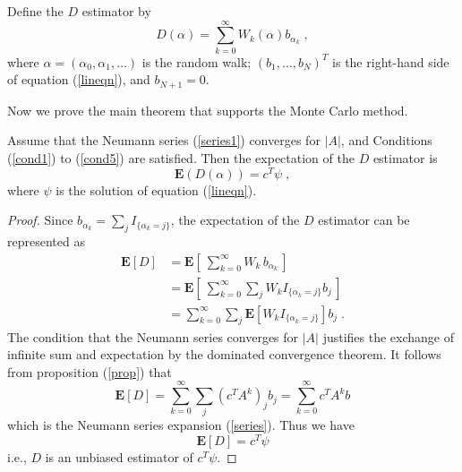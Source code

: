         \begin{definition}
            Define the $D$ estimator by
            \begin{equation} \label{D}
                D(\alpha) = \sum_{k=0}^\infty W_k(\alpha) b_{\alpha_k} \;,
            \end{equation}
            where $\alpha = (\alpha_0,\alpha_1,\ldots)$ is the random walk;
            $(b_1,\ldots,b_N)^T$ is the right-hand side of equation
            (\ref{lineqn}), and $b_{N+1} = 0$.
        \end{definition}
        Now we prove the main theorem that supports the Monte Carlo method.
        \begin{theorem} \label{mainthm}
            Assume that the Neumann series (\ref{series1}) converges for $|A|$,
            and Conditions (\ref{cond1}) to (\ref{cond5}) are satisfied.
            Then the expectation of the $D$ estimator is
            \[ \mathbf{E}( D(\alpha) ) = c^T \psi\;, \]
            where $\psi$ is the solution of equation (\ref{lineqn}).
        \end{theorem}
        \begin{proof}
            Since $b_{\alpha_k} = \sum_j I_{\{\alpha_k=j\}}$, the expectation
            of the $D$ estimator can be represented as
            \[ \begin{split}
                \mathbf{E}[D] &=
                \mathbf{E}\left[ \: \sum_{k=0}^\infty W_k \, b_{\alpha_k}
                               \, \right] \\
                &= \mathbf{E}\left[ \: \sum_{k=0}^\infty
                                \sum_j W_k I_{\{\alpha_k=j\}} b_j \,\right] \\
                &= \sum_{k=0}^\infty \sum_j \mathbf{E}\left[ W_k
                                I_{\{\alpha_k=j\}} \right] b_j \;.
            \end{split} \]
            The condition that the Neumann series converges for $|A|$ justifies
            the exchange of infinite sum and expectation by the dominated
            convergence theorem.  It follows from proposition (\ref{prop}) that
            \[ \mathbf{E}[D] = \sum_{k=0}^\infty \sum_j (c^T A^k)_j b_j
                = \sum_{k=0}^\infty c^T A^k b
            \]
            which is the Neumann series expansion (\ref{series}). Thus we have
            \begin{equation}
                \mathbf{E}[D] = c^T \psi
            \end{equation}
            i.e., $D$ is an unbiased estimator of $c^T \psi$.
        \end{proof}
        
